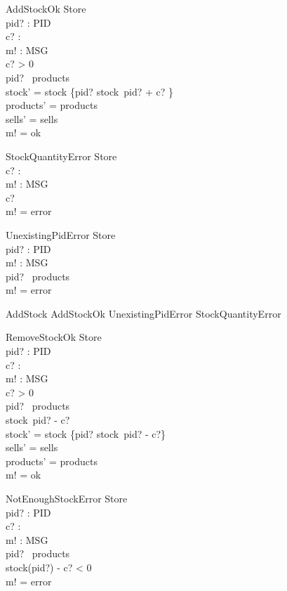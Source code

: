 \begin{schema}{AddStockOk}
\Delta Store \\
pid? : PID \\
c? : \nat \\
m! : MSG \\
\where
c? > 0 \\
pid? \in \dom~products \\
stock' = stock \oplus \{pid? \mapsto stock~pid? + c? \} \\
products' = products \\
sells' = sells \\
m! = ok
\end{schema}

\begin{schema}{StockQuantityError}
\Xi Store \\
c? : \nat \\
m! : MSG \\
\where
c?  \\
m! = error
\end{schema}

\begin{schema}{UnexistingPidError}
\Xi Store \\
pid? : PID \\
m! : MSG \\
\where
pid? \notin \dom~products \\
m! = error
\end{schema}

\begin{zed} 
AddStock  AddStockOk \lor UnexistingPidError \lor StockQuantityError
\end{zed}

\begin{schema}{RemoveStockOk}
\Delta Store \\
pid? : PID \\
c? : \nat \\
m! : MSG \\
\where
c? > 0 \\
pid? \in \dom~products \\
stock~pid? - c?   \\
stock' = stock \oplus \{pid? \mapsto stock~pid? - c?\} \\
sells' = sells \\
products' = products \\
m! = ok
\end{schema}

\begin{schema}{NotEnoughStockError}
\Xi Store \\
pid? : PID \\
c? : \nat \\
m! : MSG \\
\where
pid? \in \dom~products \\
stock(pid?) - c? < 0 \\
m! = error
\end{schema}

